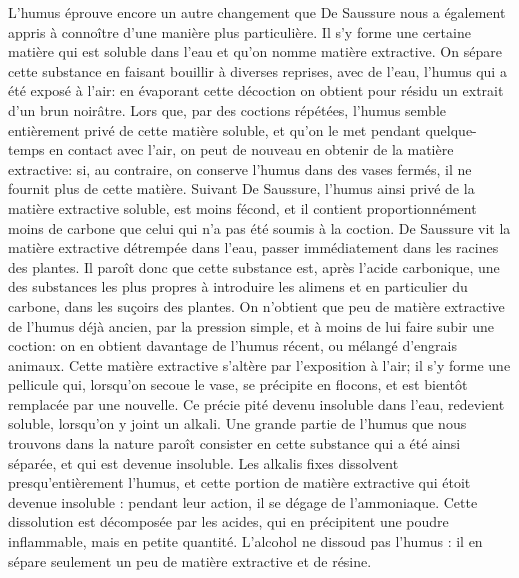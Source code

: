 L'humus éprouve encore un autre changement que De Saussure nous a également appris à connoître d'une manière plus particulière. Il s'y forme une certaine matière qui est soluble dans l'eau et qu'on nomme matière extractive. On sépare cette substance en faisant bouillir à diverses reprises, avec de l'eau, l'humus qui a été exposé à l'air: en évaporant cette décoction on obtient pour résidu un extrait d'un brun noirâtre. Lors\setcounter{page}{61} que, par des coctions répétées, l'humus semble entièrement privé de cette matière soluble, et qu'on le met pendant quelque-temps en contact avec l'air, on peut de nouveau en obtenir de la matière extractive: si, au contraire, on conserve l'humus dans des vases fermés, il ne fournit plus de cette matière. Suivant De Saussure, l'humus ainsi privé de la matière extractive soluble, est moins fécond, et il contient proportionnément moins de carbone que celui qui n'a pas été soumis à la coction. De Saussure vit la matière extractive détrempée dans l'eau, passer immédiatement dans les racines des plantes. Il paroît donc que cette substance est, après l'acide carbonique, une des substances les plus propres à introduire les alimens et en particulier du carbone, dans les suçoirs des plantes. On n'obtient que peu de matière extractive de l'humus déjà ancien, par la pression simple, et à moins de lui faire subir une coction: on en obtient davantage de l'humus récent, ou mélangé d'engrais animaux. Cette matière extractive s'altère par l'exposition à l'air; il s'y forme une pellicule qui, lorsqu'on secoue le vase, se précipite en flocons, et est bientôt remplacée par une nouvelle. Ce précie\setcounter{page}{62} pité devenu insoluble dans l'eau, redevient soluble, lorsqu'on y joint un alkali. Une grande partie de l'humus que nous trouvons dans la nature paroît consister en cette substance qui a été ainsi séparée, et qui est devenue insoluble.
Les alkalis fixes dissolvent presqu'entièrement l'humus, et cette portion de matière extractive qui étoit devenue insoluble : pendant leur action, il se dégage de l'ammoniaque. Cette dissolution est décomposée par les acides, qui en précipitent une poudre inflammable, mais en petite quantité. L'alcohol ne dissoud pas l'humus : il en sépare seulement un peu de matière extractive et de résine.
